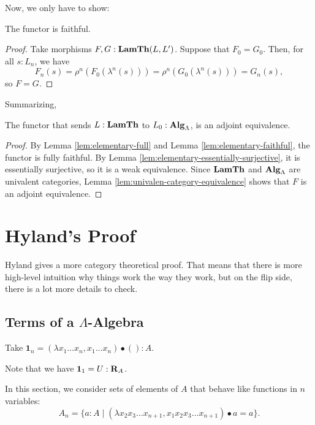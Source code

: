 Now, we only have to show:
\begin{lemma}\label{lem:elementary-faithful}
  The functor is faithful.
\end{lemma}
\begin{proof}
  Take morphisms $ F, G: \mathbf{LamTh}(L, L^\prime) $. Suppose that $ F_0 = G_0 $. Then, for all $ s: L_n $, we have
  \[ F_n(s) = \rho^n(F_0(\lambda^n(s))) = \rho^n(G_0(\lambda^n(s))) = G_n(s), \]
  so $ F = G $.
\end{proof}

Summarizing,
\begin{theorem}\label{thm:elementary-fundamental-theorem}
  The functor that sends $ L : \mathbf{LamTh} $ to $ L_0 : \mathbf{Alg}_{\Lambda} $, is an adjoint equivalence.
\end{theorem}
\begin{proof}
  By Lemma \ref{lem:elementary-full} and Lemma \ref{lem:elementary-faithful}, the functor is fully faithful. By Lemma \ref{lem:elementary-essentially-surjective}, it is essentially surjective, so it is a weak equivalence. Since $ \mathbf{LamTh} $ and $ \mathbf{Alg}_{\Lambda} $ are univalent categories, Lemma \ref{lem:univalen-category-equivalence} shows that $ F $ is an adjoint equivalence.
\end{proof}

\section{Hyland's Proof}\label{sec:hyland-fundamental-theorem}

Hyland gives a more category theoretical proof. That means that there is more high-level intuition why things work the way they work, but on the flip side, there is a lot more details to check.

\subsection{Terms of a \texorpdfstring{$ \Lambda $}{Lambda}-Algebra}

\begin{definition}
  Take $ \mathbf 1_n = (\lambda x_1 \dots x_n, x_1 \dots x_n) \bullet () : A $.
\end{definition}

\begin{remark}
  Note that we have $ \mathbf 1_1 = U : \mathbf{R}_A $.
\end{remark}

\begin{definition}
  In this section, we consider sets of elements of $ A $ that behave like functions in $ n $ variables:
  \[ A_n = \{ a : A \mid (\lambda x_2 x_3 \dots x_{n + 1}, x_1 x_2 x_3 \dots x_{n + 1}) \bullet a = a \}. \]
\end{definition}

